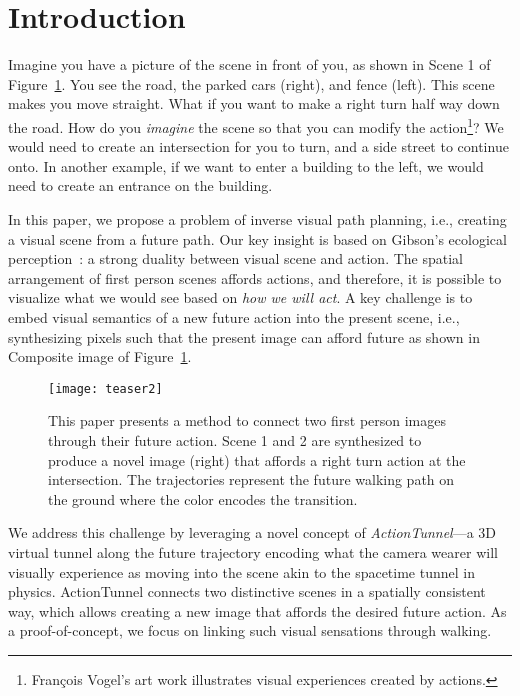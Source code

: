 \documentclass[10pt,twocolumn,letterpaper]{article}
\begin{document}
\section{Introduction}



Imagine you have a picture of the scene in front of you, as shown in Scene 1 of Figure~\ref{Fig:teaser}. You see the road, the parked cars (right), and fence (left).  This scene makes you move straight.  What if you want to make a right turn half way down the road. How do you {\em imagine} the scene so that you can modify the action\footnote{Fran\c cois Vogel's art work illustrates visual experiences created by actions.}?  We would need to create an intersection for you to turn, and a side street to continue onto. In another example, if we want to enter a building to the left, we would need to create an entrance on the building.
 
In this paper, we propose a problem of inverse visual path planning, i.e., creating a visual scene from a future path.
Our key insight is based on Gibson's ecological perception~\cite{gibson:1979}: a strong duality between  visual scene and action. The spatial arrangement of first person scenes affords actions, and therefore, it is possible to visualize what we would see based on {\em how we will act}. A key challenge is to embed visual semantics of a new future action into the present scene, i.e., synthesizing pixels such that the present image can afford future as shown in Composite image of Figure~\ref{Fig:teaser}. 

\begin{figure}[t]
  \centering  
  \label{Fig:teaser}\texttt{[image: teaser2]}
  \caption{This paper presents a method to connect two first person images through their future action. Scene 1 and 2 are synthesized to produce a novel image (right) that affords a right turn action at the intersection. The trajectories represent the future walking path on the ground where the color encodes the transition.} 
\end{figure}

We address this challenge by leveraging a novel concept of {\em ActionTunnel}---a 3D virtual tunnel along the future trajectory encoding what the camera wearer will visually experience as moving into the scene akin to the spacetime tunnel in physics. ActionTunnel connects two distinctive scenes in a spatially consistent way, which allows creating a new image that affords the desired future action. As a proof-of-concept, we focus on linking such visual sensations through walking. 
\end{document}

